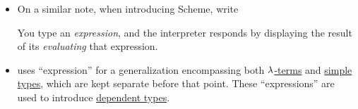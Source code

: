 \begin{comments}
\begin{itemize}
    \item On a similar note, when introducing Scheme,  write
    \begin{displayquote}
      You type an \textit{expression}, and the interpreter responds by displaying the result of its \textit{evaluating} that expression.
    \end{displayquote}

    \item {} uses \enquote{expression} for a generalization encompassing both \hyperref[def:lambda_term]{\( {\mathrm \lambda} \)-terms} and \hyperref[def:simple_type]{simple types}, which are kept separate before that point. These \enquote{expressions} are used to introduce \hyperref[con:dependent_type_theory]{dependent types}.
  \end{itemize}
\end{comments}

